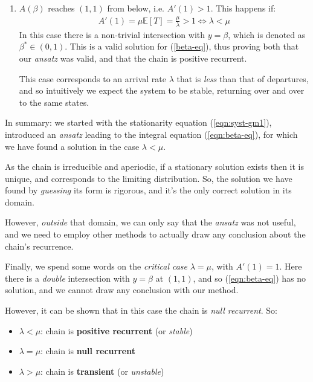 \documentclass[../template.tex]{subfiles}
\begin{document}
\begin{example}
\begin{enumerate}
        \item $A(\beta)$ reaches $(1,1)$ from below, i.e. $A'(1) > 1$. This happens if:
        \begin{align*}
            A'(1) = \mu \mathbb{E}[T] = \frac{\mu}{\lambda} > 1 \Leftrightarrow \lambda < \mu 
        \end{align*}
        In this case there is a non-trivial intersection with $y=\beta$, which is denoted as $\beta^* \in (0,1)$. This is a valid solution for (\ref{beta-eq}), thus proving both that our \textit{ansatz} was valid, and that the chain is positive recurrent. 

        This case corresponds to an arrival rate $\lambda$ that is \textit{less} than that of departures, and so intuitively we expect the system to be stable, returning over and over to the same  states. 
    \end{enumerate}

In summary: we started with the stationarity equation (\ref{eqn:syst-gm1}), introduced an \textit{ansatz} leading to the integral equation (\ref{eqn:beta-eq}), for which we have found a solution in the case $\lambda < \mu$.

As the chain is irreducible and aperiodic, if a stationary solution exists then it is unique, and corresponds to the limiting distribution. So, the solution we have found by \textit{guessing} its form is rigorous, and it's the only correct solution in its domain. 

However, \textit{outside} that domain, we can only say that the \textit{ansatz} was not useful, and we need to employ other methods to actually draw any conclusion about the chain's recurrence.   
    
\medskip

Finally, we spend some words on the \textit{critical case} $\lambda = \mu$, with $A'(1) = 1$. Here there is a \textit{double} intersection with $y=\beta$ at $(1,1)$, and so (\ref{eqn:beta-eq}) has no solution, and we cannot draw any conclusion with our method.

However, it can be shown that in this case the chain is \textit{null recurrent}. So:
\begin{itemize}
    \item $\lambda < \mu$: chain is \textbf{positive recurrent} (or \textit{stable})
    \item $\lambda = \mu$: chain is \textbf{null recurrent}
    \item $\lambda > \mu$: chain is \textbf{transient} (or \textit{unstable})   
\end{itemize}
 
\end{example}
\end{document}

